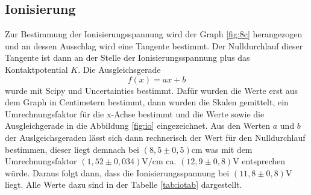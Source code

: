 \subsection{Ionisierung}
Zur Bestimmung der Ionisierungsspannung wird der Graph \ref{fig:8c} herangezogen und
an dessen Ausschlag wird eine Tangente bestimmt. Der Nulldurchlauf dieser Tangente
ist dann an der Stelle der Ionisierungsspannung plus das Kontaktpotential $K$. Die Ausgleichsgerade
\begin{equation*}
  f(x) = ax + b
\end{equation*}
wurde mit Scipy \cite{scipy} und Uncertainties \cite{uncertainties} bestimmt.
Dafür wurden die Werte erst aus dem Graph in Centimetern bestimmt, dann wurden
die Skalen gemittelt, ein Umrechnungsfaktor für die x-Achse bestimmt und die Werte
sowie die Ausgleichgerade in die Abbildung \ref{fig:io} eingezeichnet. Aus den
Werten $a$ und $b$ der Auslgeichsgeraden lässt sich dann rechnerisch der Wert
für den Nulldurchlauf bestimmen, dieser liegt demnach bei $ \left(8,5 \pm 0,5 \right)
\si{\centi \meter} $ was mit dem Umrechnungsfaktor $ \left(1,52 \pm 0,034 \right)
\si{\volt \per \centi \meter}$ ca. $\left( 12,9 \pm 0,8 \right) \si{\volt}$ entsprechen würde.
Daraus folgt dann, dass die Ionisierungsspannung bei $\left(11,8 \pm 0,8 \right) \si{\volt}$
liegt.
Alle Werte dazu sind in der Tabelle \ref{tab:iotab} dargestellt.
